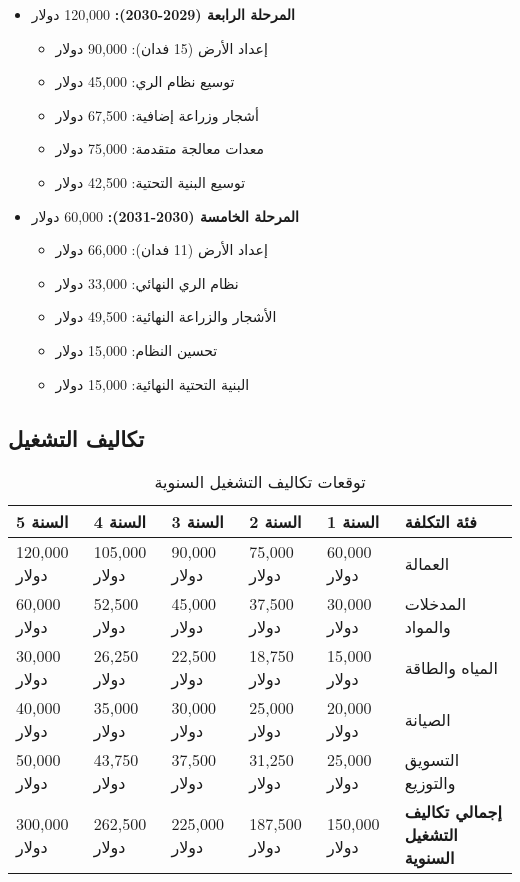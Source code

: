 \begin{itemize}
    \item \textbf{المرحلة الرابعة (2029-2030):} 120,000 دولار
    \begin{itemize}
        \item إعداد الأرض (15 فدان): 90,000 دولار
        \item توسيع نظام الري: 45,000 دولار
        \item أشجار وزراعة إضافية: 67,500 دولار
        \item معدات معالجة متقدمة: 75,000 دولار
        \item توسيع البنية التحتية: 42,500 دولار
    \end{itemize}
    
    \item \textbf{المرحلة الخامسة (2030-2031):} 60,000 دولار
    \begin{itemize}
        \item إعداد الأرض (11 فدان): 66,000 دولار
        \item نظام الري النهائي: 33,000 دولار
        \item الأشجار والزراعة النهائية: 49,500 دولار
        \item تحسين النظام: 15,000 دولار
        \item البنية التحتية النهائية: 15,000 دولار
    \end{itemize}
\end{itemize}

\subsection{تكاليف التشغيل}

\begin{table}[h]
\centering
\begin{tabular}{p{}p{}p{}p{}p{}p{}}
\hline
\textbf{السنة 5} & \textbf{السنة 4} & \textbf{السنة 3} & \textbf{السنة 2} & \textbf{السنة 1} & \textbf{فئة التكلفة} \\
\hline
120,000 دولار & 105,000 دولار & 90,000 دولار & 75,000 دولار & 60,000 دولار & العمالة \\
60,000 دولار & 52,500 دولار & 45,000 دولار & 37,500 دولار & 30,000 دولار & المدخلات والمواد \\
30,000 دولار & 26,250 دولار & 22,500 دولار & 18,750 دولار & 15,000 دولار & المياه والطاقة \\
40,000 دولار & 35,000 دولار & 30,000 دولار & 25,000 دولار & 20,000 دولار & الصيانة \\
50,000 دولار & 43,750 دولار & 37,500 دولار & 31,250 دولار & 25,000 دولار & التسويق والتوزيع \\
\hline
300,000 دولار & 262,500 دولار & 225,000 دولار & 187,500 دولار & 150,000 دولار & \textbf{إجمالي تكاليف التشغيل السنوية} \\
\hline
\end{tabular}
\caption{توقعات تكاليف التشغيل السنوية}
\end{table}

